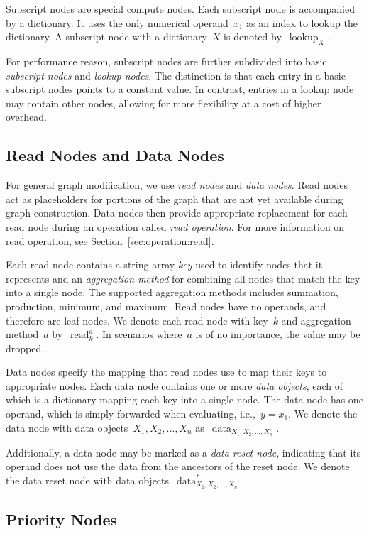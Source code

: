 \documentclass{article}
\DeclareMathOperator{\subscriptNode}{lookup}
\DeclareMathOperator{\readNode}{read}
\DeclareMathOperator{\dataNode}{data}
\begin{document}
Subscript nodes are special compute nodes.
Each subscript node is accompanied by a dictionary.
It uses the only numerical operand~$x_1$ as an index to lookup the dictionary.
A subscript node with a dictionary~$X$ is denoted by~$\subscriptNode_X$.

For performance reason, subscript nodes are further subdivided into basic \emph{subscript nodes} and \emph{lookup nodes}.
The distinction is that each entry in a basic subscript nodes points to a constant value.
In contrast, entries in a lookup node may contain other nodes, allowing for more flexibility at a cost of higher overhead.

\subsection{Read Nodes and Data Nodes}

For general graph modification, we use \emph{read nodes} and \emph{data nodes}.
Read nodes act as placeholders for portions of the graph that are not yet available during graph construction.
Data nodes then provide appropriate replacement for each read node during an operation called \emph{read operation}.
For more information on read operation, see Section~\ref{sec:operation:read}.

Each read node contains a string array \emph{key} used to identify nodes that it represents and an \emph{aggregation method} for combining all nodes that match the key into a single node.
The supported aggregation methods includes summation, production, minimum, and maximum.
Read nodes have no operands, and therefore are leaf nodes.
We denote each read node with key~$k$ and aggregation method~$a$ by~$\readNode_k^a$.
In scenarios where~$a$ is of no importance, the value may be dropped.

Data nodes specify the mapping that read nodes use to map their keys to appropriate nodes.
Each data node contains one or more \emph{data objects}, each of which is a dictionary mapping each key into a single node.
The data node has one operand, which is simply forwarded when evaluating, i.e.,~$y = x_1$.
We denote the data node with data objects~$X_1, X_2, \dots, X_n$ as~$\dataNode_{X_1, X_2,\dots, X_n}$.

Additionally, a data node may be marked as a \emph{data reset node}, indicating that its operand does not use the data from the ancestors of the reset node.
We denote the data reset node with data objects~$\dataNode^{*}_{X_1, X_2,\dots, X_n}$

\subsection{Priority Nodes}
\end{document}

